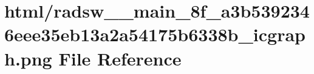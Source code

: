 \hypertarget{radsw____main__8f__a3b5392346eee35eb13a2a54175b6338b__icgraph_8png}{}\section{html/radsw\+\_\+\+\_\+main\+\_\+8f\+\_\+a3b5392346eee35eb13a2a54175b6338b\+\_\+icgraph.png File Reference}
\label{radsw____main__8f__a3b5392346eee35eb13a2a54175b6338b__icgraph_8png}

